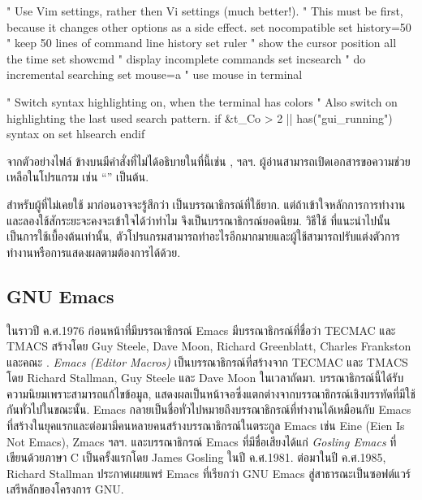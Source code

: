 \begin{thwbr}
\begin{shaded}
\begin{MyExample}
\begin{MyEx}
" Use Vim settings, rather then Vi settings (much better!).
" This must be first, because it changes other options as a side effect.
set nocompatible
set history=50          " keep 50 lines of command line history
set ruler               " show the cursor position all the time
set showcmd             " display incomplete commands
set incsearch           " do incremental searching
set mouse=a             " use mouse in terminal
 
" Switch syntax highlighting on, when the terminal has colors
" Also switch on highlighting the last used search pattern.
if &t_Co > 2 || has("gui_running")
  syntax on
  set hlsearch
endif
\end{MyEx}
\end{MyExample}
\end{shaded}

จากตัวอย่างไฟล์  ข้างบนมีคำสั่งที่ไม่ได้อธิบายในที่นี้เช่น ,  ฯลฯ. ผู้อ่านสามารถเปิดเอกสารขอความช่วยเหลือในโปรแกรม  เช่น ``'' เป็นต้น.

\medskip
สำหรับผู้ที่ไม่เคยใช้  มาก่อนอาจจะรู้สึกว่า  เป็นบรรณาธิกรณ์ที่ใช้ยาก. แต่ถ้าเข้าใจหลักการการทำงานและลองใช้สักระยะจะคงจะเข้าใจได้ว่าทำไม  จึงเป็นบรรณาธิกรณ์ยอดนิยม. วิธีใช้  ที่แนะนำไปนั้นเป็นการใช้เบื้องต้นเท่านั้น, ตัวโปรแกรมสามารถทำอะไรอีกมากมายและผู้ใช้สามารถปรับแต่งตัวการทำงานหรือการแสดงผลตามต้องการได้ด้วย. 




\subsection{GNU Emacs}
ในราวปี ค.ศ.1976 ก่อนหน้าที่มีบรรณาธิกรณ์ Emacs มีบรรณาธิกรณ์ที่ชื่อว่า TECMAC และ TMACS สร้างโดย Guy Steele, Dave Moon, Richard Greenblatt, Charles Frankston และคณะ \cite{emacstimeline}. \emph{Emacs (Editor Macros)} เป็นบรรณาธิกรณ์ที่สร้างจาก TECMAC และ TMACS โดย Richard Stallman, Guy Steele และ Dave Moon ในเวลาถัดมา. บรรณาธิกรณ์นี้ได้รับความนิยมเพราะสามารถแก้ไขข้อมูล, แสดงผลเป็นหน้าจอซึ่งแตกต่างจากบรรณาธิกรณ์เชิงบรรทัดที่มีใช้กันทั่วไปในขณะนั้น. Emacs กลายเป็นชื่อทั่วไปหมายถึงบรรณาธิกรณ์ที่ทำงานได้เหมือนกับ Emacs ที่สร้างในยุคแรกและต่อมามีคนหลายคนสร้างบรรณาธิกรณ์ในตระกูล Emacs เช่น Eine (Eien Is Not Emacs), Zmacs ฯลฯ. และบรรณาธิกรณ์ Emacs ที่มีชื่อเสียงได้แก่ \emph{Gosling Emacs} ที่เขียนด้วยภาษา C เป็นครั้งแรกโดย James Gosling ในปี ค.ศ.1981. ต่อมาในปี ค.ศ.1985, Richard Stallman ประกาศเผยแพร่ Emacs ที่เรียกว่า GNU Emacs สู่สาธารณะเป็นซอฟต์แวร์เสรีหลักของโครงการ GNU. 


\end{thwbr}

